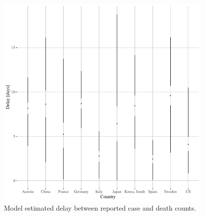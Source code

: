 \documentclass[a4paper]{tufte-handout}
\begin{document}
\begin{figure}
  \begin{center}
    \includegraphics[width=0.95\textwidth]{figs/tau_die.pdf}
  \end{center}
  \caption{\label{fig:taudie} Model estimated delay between reported
    case and death counts.}
\end{figure}
\end{document}
